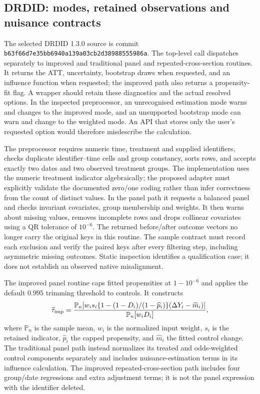 \subsection{DRDID: modes, retained observations and nuisance contracts}
The selected DRDID 1.3.0 source is commit
\texttt{b63f66d7e35bb6940a139a03cb2d38988555986a}.
The top-level call dispatches separately to improved and traditional panel
and repeated-cross-section routines. It returns the ATT, uncertainty,
bootstrap draws when requested, and an influence function when requested;
the improved path also returns a propensity-fit flag. A wrapper should
retain these diagnostics and the actual resolved options. In the inspected
preprocessor, an unrecognised estimation mode warns and changes to the
improved mode, and an unsupported bootstrap mode can warn and change to the
weighted mode. An API that stores only the user's requested option would
therefore misdescribe the calculation.\citep{exec24_drdid_reuse_source}

The preprocessor requires numeric time, treatment and supplied identifiers,
checks duplicate identifier--time cells and group constancy, sorts rows,
and accepts exactly two dates and two observed treatment groups. The
implementation uses the numeric treatment indicator algebraically; the
proposed adapter must explicitly validate the documented zero/one coding
rather than infer correctness from the count of distinct values. In the
panel path it requests a balanced panel and checks invariant covariates,
group membership and weights. It then warns about missing values, removes
incomplete rows and drops collinear covariates using a QR tolerance of
$10^{-6}$. The returned before/after outcome vectors no longer carry the
original keys in this routine. The sample contract must record each exclusion
and verify the paired keys after every filtering step, including asymmetric
missing outcomes. Static inspection identifies a qualification case; it does
not establish an observed native misalignment.\citep{exec24_drdid_reuse_source}

The improved panel routine caps fitted propensities at $1-10^{-6}$ and
applies the default $0.995$ trimming threshold to controls. It constructs
\[
 \widehat\tau_{\rm imp}
 =\frac{\mathbb P_n[ w_i s_i
       \{1-(1-D_i)/(1-\widehat p_i)\}
       (\Delta Y_i-\widehat m_i)]}{\mathbb P_n[w_iD_i]},
\]
where $\mathbb P_n$ is the sample mean, $w_i$ is the normalized input weight,
$s_i$ is the retained indicator, $\widehat p_i$ the capped propensity, and
$\widehat m_i$ the fitted control change. The traditional panel path instead
normalizes its treated and odds-weighted control components separately and
includes nuisance-estimation terms in its influence calculation. The improved
repeated-cross-section path includes four group/date regressions and extra
adjustment terms; it is not the panel expression with the identifier deleted.
\citep{exec24_drdid_reuse_source}

